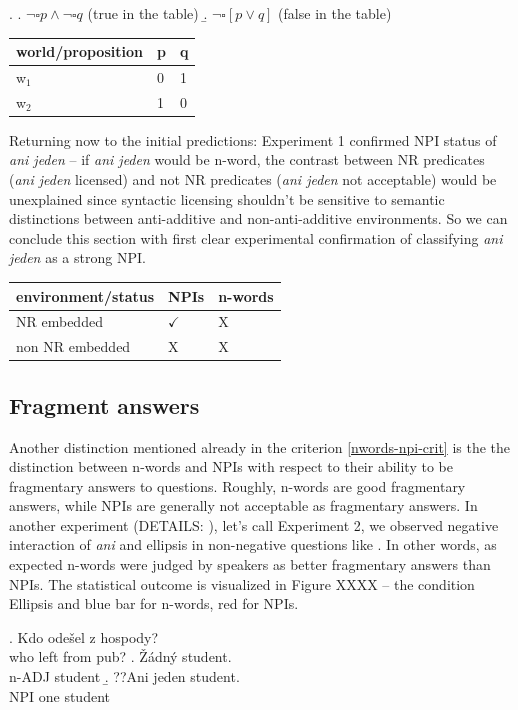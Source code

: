 \documentclass[12pt]{scrartcl}
\begin{document}
\ex. \a. \(\neg \square p \wedge \neg \square q\) (true in the table)
\b. \(\neg \square[p \vee q]\) (false in the table)

\begin{longtable}[]{@{}lll@{}}
\toprule
world/proposition & p & q\tabularnewline
\midrule
\endhead
w\(_1\) & 0 & 1\tabularnewline
w\(_2\) & 1 & 0\tabularnewline
\bottomrule
\end{longtable}

Returning now to the initial predictions: Experiment 1 confirmed NPI status of \textit{ani jeden} -- if \textit{ani jeden} would be n-word, the contrast between NR predicates (\textit{ani jeden} licensed) and not NR predicates (\textit{ani jeden} not acceptable) would be unexplained since syntactic licensing shouldn't be sensitive to semantic distinctions between anti-additive and non-anti-additive environments. So we can conclude this section with first clear  experimental confirmation of classifying \emph{ani jeden} as a strong NPI. 


\begin{longtable}[]{@{}lll@{}}
\toprule
environment/status & NPIs & n-words\tabularnewline
\midrule
\endhead
NR embedded & \(\checkmark\) & X\tabularnewline
non NR embedded & X & X\tabularnewline
\bottomrule
\end{longtable}



\hypertarget{fragment-answers}{%
\subsection{Fragment answers}\label{fragment-answers}}

Another distinction mentioned already in the criterion \ref{nwords-npi-crit} is the the distinction between n-words and NPIs with respect to their ability to be fragmentary answers to questions. Roughly, n-words are good fragmentary answers, while NPIs are generally not acceptable as fragmentary answers. In another experiment (DETAILS: ), let's call Experiment 2, we observed negative interaction of \emph{ani} and ellipsis in non-negative questions like \Next. In other words, as expected n-words were judged by speakers as better fragmentary answers than NPIs. The statistical outcome is visualized in Figure XXXX -- the condition Ellipsis and blue bar for n-words, red for NPIs.

\ex. Kdo odešel z hospody?\\
who left from pub? \a. Žádný student.\\
n-ADJ student \b. ??Ani jeden student.\\
NPI one student
\end{document}
